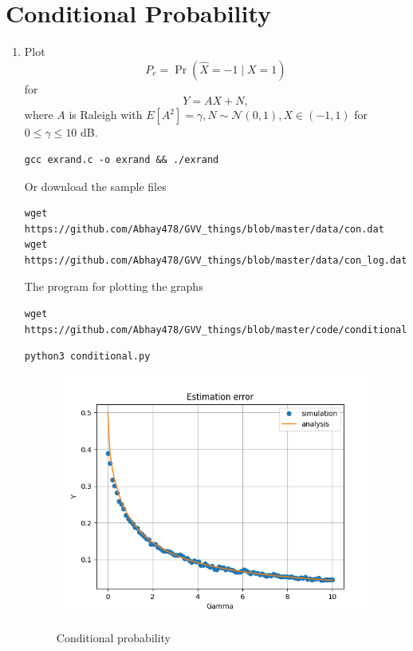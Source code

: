 \documentclass[journal,12pt,twocolumn]{IEEEtran}
\DeclareMathOperator*{\pipe}{|}
\renewcommand\thesection{\arabic{section}}
\providecommand{\pr}[1]{\ensuremath{\Pr\left(#1\right)}}
\providecommand{\sbrak}[1]{\ensuremath{{}\left[#1\right]}}
\providecommand{\brak}[1]{\ensuremath{\left(#1\right)}}
\theoremstyle{remark}
\providecommand{\gauss}[2]{\mathcal{N}\ensuremath{\left(#1,#2\right)}}
\numberwithin{equation}{section}
\numberwithin{equation}{section}
\begin{document}
\newpage

\section{Conditional Probability}
\begin{enumerate}[label=\thesection.\arabic*,ref=\thesection.\theenumi]
\item
\label{ch4_sim}
Plot 
\begin{equation}
P_e = \pr{\hat{X} = -1 \pipe X=1}
\end{equation}
%
for 
\begin{equation}
Y = AX+N,
\end{equation}
where $A$ is Raleigh with $E\sbrak{A^2} = \gamma, N \sim \gauss{0}{1}, X \in \brak{-1,1}$ for $0 \le \gamma \le 10$ dB.

    
    \begin{lstlisting}
gcc exrand.c -o exrand && ./exrand
    \end{lstlisting}

Or download the sample files
\begin{lstlisting}
wget https://github.com/Abhay478/GVV_things/blob/master/data/con.dat 
wget https://github.com/Abhay478/GVV_things/blob/master/data/con_log.dat   
\end{lstlisting}

The program for plotting the graphs
\begin{lstlisting}
wget https://github.com/Abhay478/GVV_things/blob/master/code/conditional.py 
\end{lstlisting}
\begin{lstlisting}
python3 conditional.py 
\end{lstlisting}

\begin{figure}[!h]
    \caption{Conditional probability}
    \includegraphics[width = \columnwidth]{con.png}
        \label{fig:cond}
\end{figure}


\end{enumerate}
\end{document}
